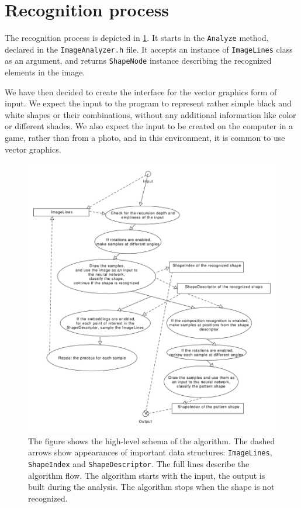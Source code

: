 \section{Recognition process}
The recognition process is depicted in \cref{fig:algoschema}. It starts in the \texttt{Analyze} method, declared in the \texttt{ImageAnalyzer.h} file. It accepts an instance of \texttt{ImageLines} class as an argument, and returns \texttt{ShapeNode} instance describing the recognized elements in the image.

We have then decided to create the interface for the vector graphics form of input. We expect the input to the program to represent rather simple black and white shapes or their combinations, without any additional information like color or different shades. We also expect the input to be created on the computer in a game, rather than from a photo, and in this environment, it is common to use vector graphics.

\begin{figure}[p]
\centering
\includegraphics[width=.9\linewidth]{ext/images/algoschema.png}
\caption{The figure shows the high-level schema of the algorithm. The dashed arrows show appearances of important data structures: \texttt{ImageLines}, \texttt{ShapeIndex} and \texttt{ShapeDescriptor}. The full lines describe the algorithm flow. The algorithm starts with the input, the output is built during the analysis. The algorithm stops when the shape is not recognized.}
\label{fig:algoschema}
\end{figure}

